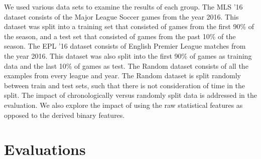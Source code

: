 We used various data sets to examine the results of each group. The MLS '16 dataset consists of the Major League Soccer games from the year 2016. This dataset was split into a training set that consisted of games from the first 90\% of the season, and a test set that consisted of games from the past 10\% of the season. The EPL '16 dataset consists of English Premier League matches from the year 2016. This dataset was also split into the first 90\% of games as training data and the last 10\% of games as test. The Random dataset consists of all the examples from every league and year. The Random dataset is split randomly between train and test sets, such that there is not consideration of time in the split. The impact of chronologically versus randomly split data is addressed in the evaluation. We also explore the impact of using the raw statistical features as opposed to the derived binary features.

\section{Evaluations}

